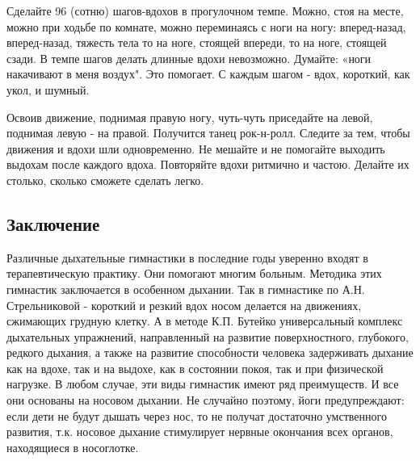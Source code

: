 \documentclass[a4paper]{article}
\begin{document}
    Сделайте 96 (сотню) шагов-вдохов в прогулочном темпе. Можно, стоя на месте, можно при ходьбе по комнате, можно переминаясь с ноги на ногу: вперед-назад, вперед-назад, тяжесть тела то на ноге, стоящей впереди, то на ноге, стоящей сзади. В темпе шагов делать длинные вдохи невозможно. Думайте: «ноги накачивают в меня воздух". Это помогает. С каждым шагом - вдох, короткий, как укол, и шумный.

    Освоив движение, поднимая правую ногу, чуть-чуть приседайте на левой, поднимая левую - на правой. Получится танец рок-н-ролл. Следите за тем, чтобы движения и вдохи шли одновременно. Не мешайте и не помогайте выходить выдохам после каждого вдоха. Повторяйте вдохи ритмично и частою. Делайте их столько, сколько сможете сделать легко.

    \subsection{Заключение}
    Различные дыхательные гимнастики в последние годы уверенно входят в терапевтическую практику. Они помогают многим больным. Методика этих гимнастик заключается в особенном дыхании. Так в гимнастике по А.Н. Стрельниковой - короткий и резкий вдох носом делается на движениях, сжимающих грудную клетку. А в методе К.П. Бутейко универсальный комплекс дыхательных упражнений, направленный на развитие поверхностного, глубокого, редкого дыхания, а также на развитие способности человека задерживать дыхание как на вдохе, так и на выдохе, как в состоянии покоя, так и при физической нагрузке. В любом случае, эти виды гимнастик имеют ряд преимуществ. И все они основаны на носовом дыхании. Не случайно поэтому, йоги предупреждают: если дети не будут дышать через нос, то не получат достаточно умственного развития, т.к. носовое дыхание стимулирует нервные окончания всех органов, находящиеся в носоглотке.
\end{document}
